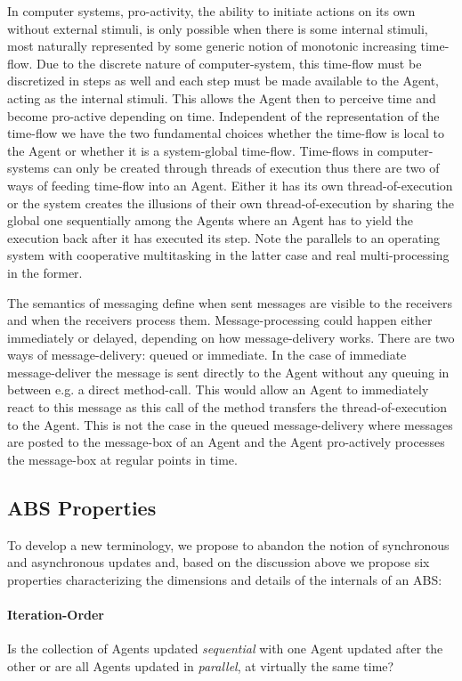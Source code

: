 In computer systems, pro-activity, the ability to initiate actions on its own without external stimuli, is only possible when there is some internal stimuli, most naturally represented by some generic notion of monotonic increasing time-flow. Due to the discrete nature of computer-system, this time-flow must be discretized in steps as well and each step must be made available to the Agent, acting as the internal stimuli. This allows the Agent then to perceive time and become pro-active depending on time. Independent of the representation of the time-flow we have the two fundamental choices whether the time-flow is local to the Agent or whether it is a system-global time-flow. Time-flows in computer-systems can only be created through threads of execution thus there are two of ways of feeding time-flow into an Agent. Either it has its own thread-of-execution or the system creates the illusions of their own thread-of-execution by sharing the global one sequentially among the Agents where an Agent has to yield the execution back after it has executed its step. Note the parallels to an operating system with cooperative multitasking in the latter case and real multi-processing in the former.

\medskip 

The semantics of messaging define when sent messages are visible to the receivers and when the receivers process them. Message-processing could happen either immediately or delayed, depending on how message-delivery works. There are two ways of message-delivery: queued or immediate. In the case of immediate message-deliver the message is sent directly to the Agent without any queuing in between e.g. a direct method-call. This would allow an Agent to immediately react to this message as this call of the method transfers the thread-of-execution to the Agent. This is not the case in the queued message-delivery where messages are posted to the message-box of an Agent and the Agent pro-actively processes the message-box at regular points in time.

\subsection{ABS Properties}
To develop a new terminology, we propose to abandon the notion of synchronous and asynchronous updates and, based on the discussion above we propose six properties characterizing the dimensions and details of the internals of an ABS:

\paragraph{Iteration-Order}
Is the collection of Agents updated \textit{sequential} with one Agent updated after the other or are all Agents updated in \textit{parallel}, at virtually the same time?

